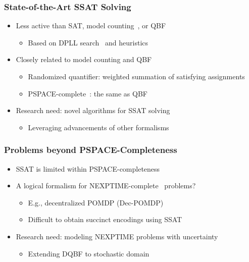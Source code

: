 \begin{frame}
      \frametitle{State-of-the-Art SSAT Solving}
      \begin{itemize}
            \item Less active than SAT, model counting~\cite{SATHandbook-ModelCounting}, or QBF
                  \pause
                  \begin{itemize}
                        \item Based on DPLL search~\cite{Davis1962} and heuristics
                              \pause
                  \end{itemize}
            \item Closely related to model counting and QBF
                  \pause
                  \begin{itemize}
                        \item Randomized quantifier: weighted summation of satisfying assignments
                              \pause
                        \item PSPACE-complete~\cite{Stockmeyer1973}: the same as QBF
                              \pause
                  \end{itemize}
            \item \alert{Research need: novel algorithms for SSAT solving}
                  \pause
                  \begin{itemize}
                        \item Leveraging advancements of other formalisms
                  \end{itemize}
      \end{itemize}
\end{frame}

\begin{frame}
      \frametitle{Problems beyond PSPACE-Completeness}
      \begin{itemize}
            \item SSAT is limited within PSPACE-completeness
                  \pause
            \item A logical formalism for NEXPTIME-complete~\cite{Peterson1979} problems?
                  \pause
                  \begin{itemize}
                        \item E.g., decentralized POMDP (Dec-POMDP)~\cite{Bernstein2002}
                              \pause
                        \item Difficult to obtain succinct encodings using SSAT
                              \pause
                  \end{itemize}
            \item \alert{Research need: modeling NEXPTIME problems with uncertainty}
                  \pause
                  \begin{itemize}
                        \item Extending DQBF to stochastic domain
                  \end{itemize}
      \end{itemize}
\end{frame}

